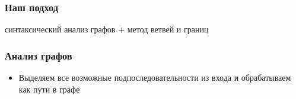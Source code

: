 \documentclass{beamer}
\begin{document}
 \begin{frame}
     \frametitle{Наш подход}
     \begin{center}
         синтаксический анализ графов  +  метод ветвей и границ
     \end{center}
 \end{frame}
 
 
 \begin{frame}
     \frametitle{Анализ графов}
     \begin{itemize}
         \item Выделяем все возможные подпоследовательности из входа и обрабатываем как пути в графе

\end{itemize}
\end{frame}
\end{document}
